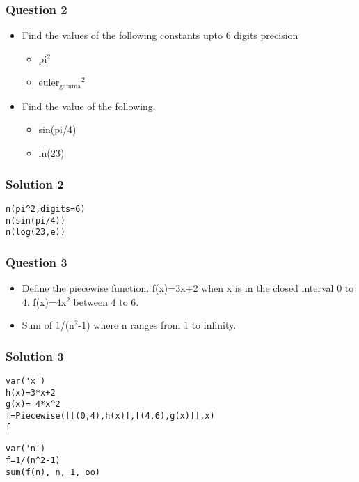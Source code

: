 \documentclass[presentation]{beamer}
\begin{document}
\begin{frame}
\frametitle{Question 2}
\label{sec-4}


\begin{itemize}
\item Find the values of the following constants upto 6 digits  precision

\begin{itemize}
\item pi$^2$
\item euler$_{\mathrm{gamma}}$$^2$
\end{itemize}

\end{itemize}

\begin{itemize}
\item Find the value of the following.

\begin{itemize}
\item sin(pi/4)
\item ln(23)
\end{itemize}

\end{itemize}
\end{frame}
\begin{frame}[fragile]
\frametitle{Solution 2}
\label{sec-5}

\lstset{language=Python}
\begin{lstlisting}
n(pi^2,digits=6)
n(sin(pi/4))
n(log(23,e))
\end{lstlisting}
\end{frame}
\begin{frame}
\frametitle{Question 3}
\label{sec-6}

\begin{itemize}
\item Define the piecewise function. 
   f(x)=3x+2 
   when x is in the closed interval 0 to 4.
   f(x)=4x$^2$
   between 4 to 6.
\item Sum  of 1/(n$^2$-1) where n ranges from 1 to infinity.
\end{itemize}
\end{frame}
\begin{frame}[fragile]
\frametitle{Solution 3}
\label{sec-7}

\lstset{language=Python}
\begin{lstlisting}
var('x') 
h(x)=3*x+2 
g(x)= 4*x^2
f=Piecewise([[(0,4),h(x)],[(4,6),g(x)]],x)
f
\end{lstlisting}

\lstset{language=Python}
\begin{lstlisting}
var('n')
f=1/(n^2-1) 
sum(f(n), n, 1, oo)
\end{lstlisting}
\end{frame}
\end{document}
